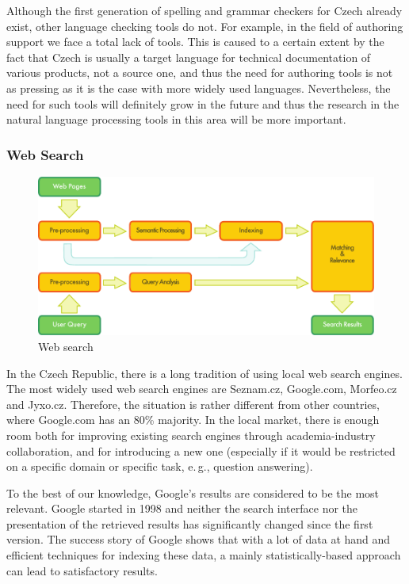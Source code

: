 \begin{multicols}{2}
Although the first generation of spelling and grammar checkers for Czech already exist, other language checking tools do not. For example, in the field of authoring support we face a total lack of tools. This is caused to a certain extent by the fact that Czech is usually a target language for technical documentation of various products, not a source one, and thus the need for authoring tools is not as pressing as it is the case with more widely used languages. Nevertheless, the need for such tools will definitely grow in the future and thus the research in the natural language processing tools in this area will be more important.

\subsubsection{Web Search}

\begin{figure}[htb]
  \center
  \includegraphics[width=\textwidth]{../_media/english/web_search_architecture}
  \caption{Web search}
  \label{fig:websearcharch_en}
 \end{figure}

In the Czech Republic, there is a long tradition of using local web search engines. The most widely used web search engines are Seznam.cz, Google.com, Morfeo.cz and Jyxo.cz. Therefore, the situation is rather different from other countries, where Google.com has an 80\% majority. In the local market, there is enough room both for improving existing search engines through academia-industry collaboration, and for introducing a new one (especially if it would be restricted on a specific domain or specific task, e.\,g., question answering).

To the best of our knowledge, Google's results are considered to be the most relevant. Google started in 1998 and neither the search interface nor the presentation of the retrieved results has significantly changed since the first version. The success story of Google shows that with a lot of data at hand and efficient techniques for indexing these data, a mainly statistically-based approach can lead to satisfactory results.


\end{multicols}

